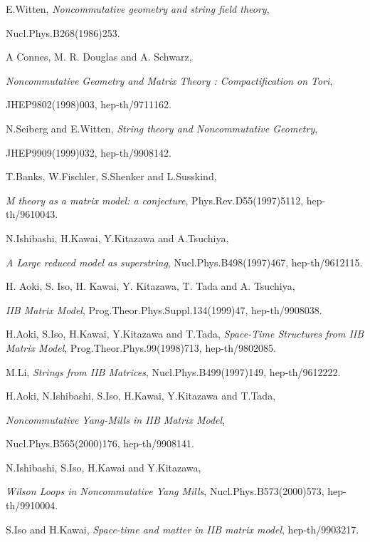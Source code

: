 \documentclass[a4paper,11pt]{article}
\begin{document}
\begin{thebibliography}{99}


E.Witten, 
{\it Noncommutative geometry and string field theory}, 

Nucl.Phys.B268(1986)253. 

A Connes, M. R. Douglas and A. Schwarz, 

{\it Noncommutative Geometry and Matrix Theory
     : Compactification on Tori}, 

JHEP9802(1998)003, hep-th/9711162. 



N.Seiberg and E.Witten, 
{\it String theory and Noncommutative Geometry}, 

JHEP9909(1999)032, hep-th/9908142.

T.Banks, W.Fischler, S.Shenker and L.Susskind, 

{\it M theory as a matrix model: a conjecture}, 
Phys.Rev.D55(1997)5112, hep-th/9610043.

N.Ishibashi, H.Kawai, Y.Kitazawa and A.Tsuchiya, 

{\it A Large \coordHE{} reduced model as superstring}, 
Nucl.Phys.B498(1997)467, hep-th/9612115.


H. Aoki, S. Iso, H. Kawai, Y. Kitazawa, T. Tada and  A. Tsuchiya, 

{\it IIB Matrix Model},
Prog.Theor.Phys.Suppl.134(1999)47, hep-th/9908038.

H.Aoki, S.Iso, H.Kawai, Y.Kitazawa and T.Tada, 
{\it Space-Time Structures from IIB Matrix Model}, 
Prog.Theor.Phys.99(1998)713, 
hep-th/9802085. 





M.Li, 
{\it Strings from IIB Matrices}, 
Nucl.Phys.B499(1997)149, hep-th/9612222. 

H.Aoki, N.Ishibashi, S.Iso, H.Kawai, Y.Kitazawa and T.Tada, 

{\it Noncommutative Yang-Mills in IIB Matrix Model}, 

Nucl.Phys.B565(2000)176, hep-th/9908141. 

N.Ishibashi, S.Iso, H.Kawai and Y.Kitazawa, 

{\it Wilson Loops in Noncommutative Yang Mills}, 
Nucl.Phys.B573(2000)573, 
hep-th/9910004.  

S.Iso and H.Kawai, 
{\it Space-time and matter in IIB matrix model}, 
hep-th/9903217.


\end{thebibliography}
\end{document}
